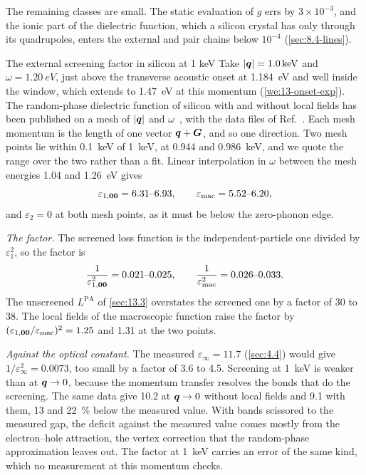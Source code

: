 The remaining classes are small. The static evaluation of $g$ errs by $3\times10^{-3}$, and the ionic part of the dielectric function, which a silicon crystal has only through its quadrupoles, enters the external and pair chains below $10^{-4}$ (\cref{sec:8.4-lines}).

\begin{workedexample}{The external screening factor in silicon at 1 keV}\label{we:13-external}
Take $|\bm{q}| = \SI{1.0}{keV}$ and $\omega = \SI{1.20}{eV}$, just above the transverse acoustic onset at \SI{1.184}{eV} and well inside the window, which extends to \SI{1.47}{eV} at this momentum (\cref{we:13-onset-exp}). The random-phase dielectric function of silicon with and without local fields has been published on a mesh of $|\bm{q}|$ and $\omega$~\cite[Sect.~III\,B]{knapen2021dark}, with the data files of Ref.~\cite{knapen2022darkelf}. Each mesh momentum is the length of one vector $\bm{q} + \bm{G}$, and so one direction. Two mesh points lie within \SI{0.1}{keV} of \SI{1}{keV}, at 0.944 and \SI{0.986}{keV}, and we quote the range over the two rather than a fit. Linear interpolation in $\omega$ between the mesh energies 1.04 and \SI{1.26}{eV} gives
\begin{equation*}
  \varepsilon_{1,\bm{0}\bm{0}} = 6.31\text{--}6.93 , \qquad \varepsilon_{\mathrm{mac}} = 5.52\text{--}6.20 ,
\end{equation*}
and $\varepsilon_2 = 0$ at both mesh points, as it must be below the zero-phonon edge.

\emph{The factor.} The screened loss function is the independent-particle one divided by $\varepsilon_1^2$, so the factor is
\begin{equation*}
  \frac{1}{\varepsilon_{1,\bm{0}\bm{0}}^2} = 0.021\text{--}0.025 , \qquad \frac{1}{\varepsilon_{\mathrm{mac}}^2} = 0.026\text{--}0.033 .
\end{equation*}
The unscreened $L^{\mathrm{PA}}$ of \cref{sec:13.3} overstates the screened one by a factor of 30 to 38. The local fields of the macroscopic function raise the factor by $(\varepsilon_{1,\bm{0}\bm{0}}/\varepsilon_{\mathrm{mac}})^2 = 1.25$ and 1.31 at the two points.

\emph{Against the optical constant.} The measured $\varepsilon_\infty = 11.7$ (\cref{sec:4.4}) would give $1/\varepsilon_\infty^2 = 0.0073$, too small by a factor of 3.6 to 4.5. Screening at \SI{1}{keV} is weaker than at $\bm{q} \to 0$, because the momentum transfer resolves the bonds that do the screening. The same data give 10.2 at $\bm{q} \to 0$ without local fields and 9.1 with them, 13 and \SI{22}{\percent} below the measured value. With bands scissored to the measured gap, the deficit against the measured value comes mostly from the electron--hole attraction, the vertex correction that the random-phase approximation leaves out. The factor at \SI{1}{keV} carries an error of the same kind, which no measurement at this momentum checks.


\end{workedexample}
